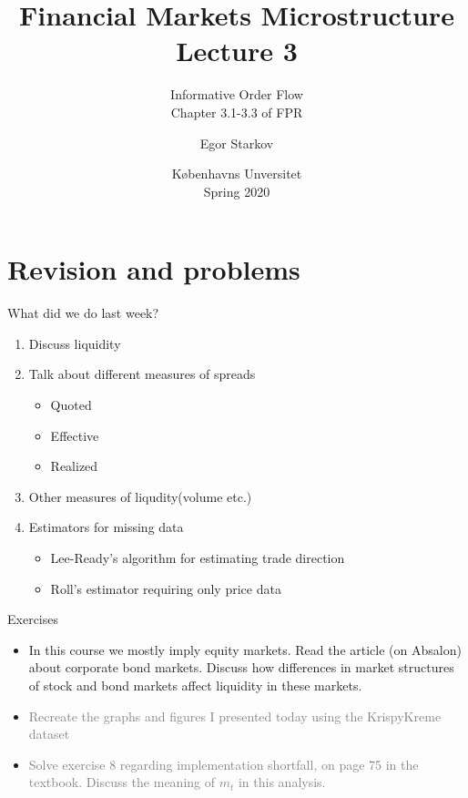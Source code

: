 \documentclass[english,10pt]{beamer}
\title{Financial Markets Microstructure \\ Lecture 3}
\subtitle{Informative Order Flow\\
	Chapter 3.1-3.3 of FPR}
\author{Egor Starkov}
\date{K{\o}benhavns Unversitet \\
	Spring 2020}
\begin{document}
	\frame[plain]{\titlepage}
	\addtocounter{framenumber}{-1}

\section{Revision and problems}

\begin{frame}{What did we do last week?}
\begin{enumerate}
	\item Discuss liquidity
	\item Talk about different measures of spreads
	\begin{itemize}
		\item Quoted
		\item Effective
		\item Realized
	\end{itemize}
	\item Other measures of liqudity(volume etc.)
	\item Estimators for missing data
	\begin{itemize}
		\item Lee-Ready's algorithm for estimating trade direction
		\item Roll's estimator requiring only price data
	\end{itemize}
\end{enumerate}
\end{frame}


\begin{frame}{Exercises}
	\begin{itemize}
		\item In this course we mostly imply equity markets. Read the article (on Absalon) about corporate bond markets. Discuss how differences in market structures of stock and bond markets affect liquidity in these markets.
		\item \textcolor{gray}{Recreate the graphs and figures I presented today using the KrispyKreme dataset}
		\item \textcolor{gray}{Solve exercise 8 regarding implementation shortfall, on page 75 in the textbook.
		Discuss the meaning of $m_t$ in this analysis.}
	\end{itemize}
\end{frame}
\end{document}
